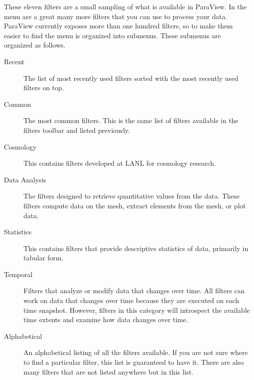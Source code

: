 
These eleven filters are a small sampling of what is available in ParaView.
In the  menu are a great many more filters that you can use to
process your data.  ParaView currently exposes more than one hundred filters, so to
make them easier to find the  menu is organized into submenus.
These submenus are organized as follows.

\begin{description}
\item[Recent] The list of most recently used filters sorted with the most
  recently used filters on top.
\item[Common] The most common filters.  This is the same list of filters
  available in the filters toolbar and listed previously.
\item[Cosmology] This contains filters developed at LANL for cosmology research. 
\item[Data Analysis] The filters designed to retrieve quantitative values
  from the data.  These filters compute data on the mesh, extract elements
  from the mesh, or plot data.
\item[Statistics] This contains filters that provide descriptive
  statistics of data, primarily in tabular form.
\item[Temporal] Filters that analyze or modify data that changes over time.
  All filters can work on data that changes over time because they are
  executed on each time snapshot.  However, filters in this category will
  introspect the available time extents and examine how data changes over
  time.
\item[Alphabetical] An alphabetical listing of all the filters available.
  If you are not sure where to find a particular filter, this list is
  guaranteed to have it.  There are also many filters that are not listed
  anywhere but in this list.
\end{description}


